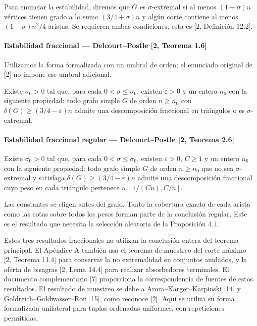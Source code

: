 \documentclass[spanish,11pt,a4paper]{article}
\begin{document}
Para enunciar la estabilidad, diremos que \(G\) es \(\sigma\)-extremal si al menos \((1-\sigma)n\) vértices tienen grado a lo sumo \((3/4+\sigma)n\) y algún corte contiene al menos \((1-\sigma)n^2/4\) aristas. Se requieren ambas condiciones; esta es {[}2, Definición 12.2{]}.

\paragraph{Estabilidad fraccional --- Delcourt--Postle {[}2, Teorema 1.6{]}}\label{estabilidad-fraccional-delcourtpostle-2-teorema-1.6}

Utilizamos la forma formalizada con un umbral de orden; el enunciado original de {[}2{]} no impone ese umbral adicional.

Existe \(\sigma_0>0\) tal que, para cada \(0<\sigma\le\sigma_0\), existen \(\varepsilon>0\) y un entero \(n_0\) con la siguiente propiedad: todo grafo simple \(G\) de orden \(n\ge n_0\) con \(\delta(G)\ge(3/4-\varepsilon)n\) admite una descomposición fraccional en triángulos o es \(\sigma\)-extremal.

\paragraph{Estabilidad fraccional regular --- Delcourt--Postle {[}2, Teorema 2.6{]}}\label{estabilidad-fraccional-regular-delcourtpostle-2-teorema-2.6}

Existe \(\sigma_0>0\) tal que, para cada \(0<\sigma\le\sigma_0\), existen \(\varepsilon>0\), \(C\ge1\) y un entero \(n_0\) con la siguiente propiedad: todo grafo simple \(G\) de orden \(n\ge n_0\) que no sea \(\sigma\)-extremal y satisfaga \(\delta(G)\ge(3/4-\varepsilon)n\) admite una descomposición fraccional cuyo peso en cada triángulo pertenece a \([1/(Cn),C/n]\).

Las constantes se eligen antes del grafo. Tanto la cobertura exacta de cada arista como las cotas sobre todos los pesos forman parte de la conclusión regular. Este es el resultado que necesita la selección aleatoria de la Proposición 4.1.

Estos tres resultados fraccionales no utilizan la conclusión entera del teorema principal. El Apéndice A también usa el teorema de muestreo del corte máximo {[}2, Teorema 11.4{]} para conservar la no extremalidad en conjuntos anidados, y la oferta de bisagras {[}2, Lema 14.4{]} para realizar absorbedores terminales. El documento complementario {[}7{]} proporciona la correspondencia de fuentes de estos resultados. El resultado de muestreo se debe a Arora--Karger--Karpinski {[}14{]} y Goldreich--Goldwasser--Ron {[}15{]}, como reconoce {[}2{]}. Aquí se utiliza su forma formalizada unilateral para tuplas ordenadas uniformes, con repeticiones permitidas.
\end{document}
